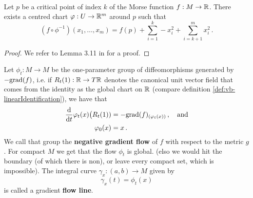 \begin{theorem}\label{thm:morse-morseLemma}
	Let $p$ be a critical point of index $k$ of the Morse function $f:M\to \mathbb{R}$. There exists a centred chart $\varphi:U\to \mathbb{R}^m$ around $p$ such that 
	\begin{equation*}
		(f\circ \phi^{-1})(x_1,\dots, x_m)=f(p)+\sum_{i=1}^{k}-x_i^2+\sum_{i=k+1}^{m}x_i^2 \,.
	\end{equation*}
\end{theorem}
\begin{proof}
	We refer to Lemma 3.11 in \cite{banyaga2004lectures} for a proof. 
\end{proof}


\begin{definition}\label{def:morse-gradienFlowFlowLine}
Let $\phi_t:M\to M$ be the one-parameter group of diffeomorphisms generated by $-\mathrm{grad}(f)$, i.e. if $R_t(1):\mathbb{R}\to T\mathbb{R}$ denotes the canonical unit vector field that comes from the identity as the global chart on $\mathbb{R}$ (compare definition \ref{def:vb-linearIdentification}), we have that 
\begin{align*}
\frac{\mathop{}\!\mathrm{d}}{\mathop{}\!\mathrm{d} t} \varphi_t(x)\big(R_t(1))
	&= -\mathrm{grad}(f)_{(\varphi_t(x))}\, , \quad \text{and}\\
	\varphi_0(x)&=x\, .
\end{align*} We call that group the \textbf{negative gradient flow} of $f$ with respect to the metric $g$. For compact $M$ we get that the flow $\phi_t$ is global. (elso we would hit the boundary (of which there is non), or leave every compact set, which is impossible).
The integral curve $\gamma_x:(a,b)\to M$ given by
\begin{equation*}
	\gamma_x(t)=\phi_t(x)
\end{equation*} is called a gradient \textbf{flow line}.
\end{definition}

